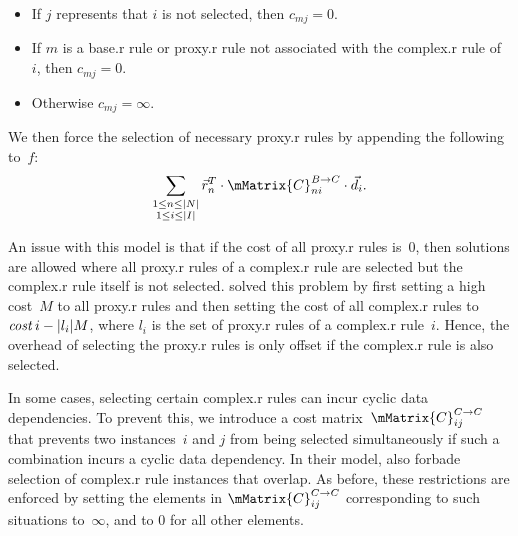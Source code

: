 \vspace{\baselineskip}

\begin{itemize}
  \item If $j$ represents that $i$ is not selected, then \mbox{$c_{mj} = 0$}.
  \item If $m$ is a \gls{base.r} \gls{rule} or \gls{proxy.r} \gls{rule} not
    associated with the \gls{complex.r} \gls{rule} of~$i$, then \mbox{$c_{mj} =
      0$}.
  \item Otherwise \mbox{$c_{mj} = \infty$}.
\end{itemize}
We then force the selection of necessary \gls{proxy.r} \glspl{rule} by appending the following
to~$f$:
\begin{displaymath}
  \sum_{\substack{1 \leq n \leq |N|\\1 \leq i \leq |I|}}
    \mVector{r}_n^T \cdot
    \mMatrix{C}_{ni}^{\mCategory{B} \rightarrow \mCategory{C}} \cdot \mVector{d}_i.
\end{displaymath}

An issue with this model is that if the cost of all \gls{proxy.r} \glspl{rule} is~0, then
solutions are allowed where all \gls{proxy.r} \glspl{rule} of a \gls{complex.r} \gls{rule} are selected but
the \gls{complex.r} \gls{rule} itself is not selected.
%
\citeauthor{Ebner2008} solved this
problem by first setting a high cost~$M$ to all \gls{proxy.r} \glspl{rule} and then setting
the cost of all \gls{complex.r} \glspl{rule} to \mbox{$\operatorname{\textrm{\textit{cost}}}{i} - |l_i|M$}, where
$l_i$ is the set of \gls{proxy.r} \glspl{rule} of a \gls{complex.r} \gls{rule}~$i$.
%
Hence, the overhead of
selecting the \gls{proxy.r} \glspl{rule} is only offset if the \gls{complex.r} \gls{rule} is also selected.

In some cases, selecting certain \gls{complex.r} \glspl{rule} can incur cyclic data
dependencies.
%
To prevent this, we introduce a cost
matrix~$\mMatrix{C}_{ij}^{\mCategory{C} \rightarrow \mCategory{C}}$ that
prevents two instances~$i$ and $j$ from being selected simultaneously if such a
combination incurs a cyclic data dependency.
%
In their model,
\citeauthor{Ebner2008} also forbade selection of \gls{complex.r} \gls{rule} instances that
overlap.
%
As before, these restrictions are enforced by setting the elements in
$\mMatrix{C}_{ij}^{\mCategory{C} \rightarrow \mCategory{C}}$ corresponding to
such situations to~$\infty$, and to 0 for all other elements.

